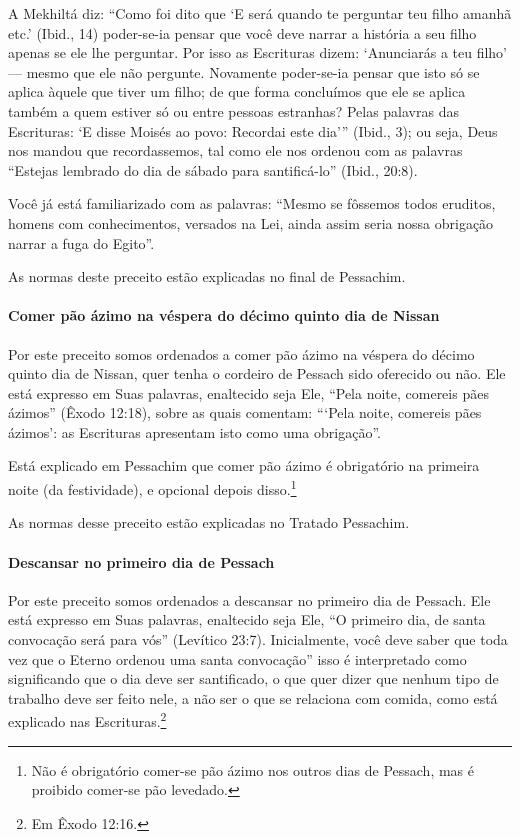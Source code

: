 A Mekhiltá diz: ``Como foi dito que `E será quando te perguntar teu
filho amanhã etc.' (Ibid., 14) poder-se-ia pensar que você deve narrar a
história a seu filho apenas se ele lhe perguntar. Por isso as Escrituras
dizem: `Anunciarás a teu filho' --- mesmo que ele não pergunte.
Novamente poder-se-ia pensar que isto só se aplica àquele que tiver um
filho; de que forma concluímos que ele se aplica também a quem estiver
só ou entre pessoas estranhas? Pelas palavras das Escrituras: `E disse
Moisés ao povo: Recordai este dia''' (Ibid., 3); ou seja, Deus nos
mandou que recordassemos, tal como ele nos ordenou com as palavras
``Estejas lembrado do dia de sábado para santificá-lo'' (Ibid., 20:8).

Você já está familiarizado com as palavras: ``Mesmo se fôssemos todos
eruditos, homens com conhecimentos, versados na Lei, ainda assim seria
nossa obrigação narrar a fuga do Egito''.

As normas deste preceito estão explicadas no final de Pessachim.

\paragraph{Comer pão ázimo na véspera do décimo quinto dia de Nissan}

Por este preceito somos ordenados a comer pão ázimo na véspera do décimo
quinto dia de Nissan, quer tenha o cordeiro de Pessach sido oferecido ou não. Ele está expresso em Suas palavras, enaltecido seja Ele,
``Pela noite, comereis pães ázimos'' (Êxodo 12:18), sobre as quais
comentam: ```Pela noite, comereis pães ázimos': as Escrituras apresentam
isto como uma obrigação''.

Está explicado em Pessachim que comer pão ázimo é obrigatório na primeira
noite (da festividade), e opcional depois disso.\footnote{Não é obrigatório comer-se pão ázimo nos outros dias de Pessach, mas é proibido comer-se pão levedado.}

As normas desse preceito estão explicadas no Tratado Pessachim.

\paragraph{Descansar no primeiro dia de Pessach}

Por este preceito somos ordenados a descansar no primeiro dia de
Pessach. Ele está expresso em Suas palavras, enaltecido seja Ele, ``O
primeiro dia, de santa convocação será para vós'' (Levítico 23:7).
Inicialmente, você deve saber que toda vez que o Eterno ordenou uma
santa convocação'' isso é interpretado como significando que o dia deve ser santificado, o que quer dizer que nenhum tipo de trabalho deve ser feito nele, a não ser o que se relaciona com comida, como está explicado nas Escrituras.\footnote{Em Êxodo 12:16.}

